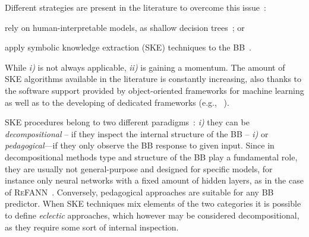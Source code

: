 \documentclass[sigconf]{acmart}
\begin{document}
Different strategies are present in the literature to overcome this issue~\cite{guidotti2018survey}:
%
\begin{inlinelist}
	\item rely on human-interpretable models, as shallow decision trees~\cite{Rudin2019}; or
	\item apply symbolic knowledge extraction (SKE) techniques to the BB~\cite{KENNY2021103459}.
\end{inlinelist}
%
While \textit{i)} is not always applicable, \textit{ii)} is gaining a momentum. The amount of SKE algorithms available in the literature is constantly increasing, also thanks to the software support provided by object-oriented frameworks for machine learning 
as well as to the developing of dedicated frameworks (e.g., \psyke{}~\cite{psyke-woa2021,psyke-ia2022,psyke-extraamas2022}).

SKE procedures belong to two different paradigms~\cite{andrews1995survey}: \textit{i)} they can be \emph{decompositional} -- if they inspect the internal structure of the BB -- \textit{i)} or \emph{pedagogical}---if they only observe the BB response to given input.
%
Since in decompositional methods type and structure of the BB play a fundamental role, they are usually not general-purpose and designed for specific models, for instance only neural networks with a fixed amount of hidden layers, as in the case of \textsc{ReFANN}~\cite{setiono2002extraction}.
%
Conversely, pedagogical approaches are suitable for any BB predictor.
%
When SKE techniques mix elements of the two categories it is possible to define \emph{eclectic} approaches, which however may be considered decompositional, as they require some sort of internal inspection.
\end{document}
